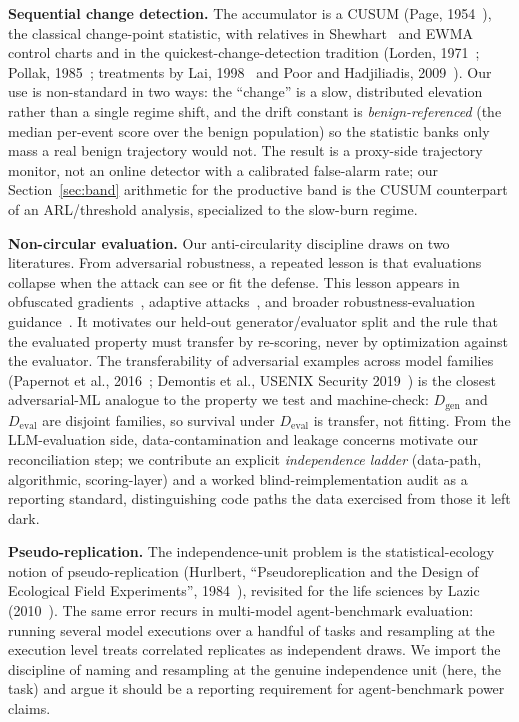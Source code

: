 \documentclass[11pt]{article}
\newcommand{\Dgen}{\ensuremath{D_{\mathrm{gen}}}}
\newcommand{\Deval}{\ensuremath{D_{\mathrm{eval}}}}
\begin{document}
\textbf{Sequential change detection.} The accumulator is a CUSUM (Page, 1954~\citep{page1954cusum}), the classical
change-point statistic, with relatives in Shewhart~\citep{shewhart1931economic} and EWMA~\citep{roberts1959ewma} control charts and in the
quickest-change-detection tradition (Lorden, 1971~\citep{lorden1971procedures}; Pollak, 1985~\citep{pollak1985optimal};
treatments by Lai, 1998~\citep{lai1998information} and Poor and Hadjiliadis, 2009~\citep{poor2009quickest}). Our use is non-standard in two ways: the ``change'' is a slow, distributed
elevation rather than a single regime shift, and the drift constant is \emph{benign-referenced} (the
median per-event score over the benign population) so the statistic banks only mass a real benign
trajectory would not. The result is a proxy-side trajectory monitor, not an online detector with a
calibrated false-alarm rate; our Section~\ref{sec:band} arithmetic for the productive band is the CUSUM
counterpart of an ARL/threshold analysis, specialized to the slow-burn regime.

\textbf{Non-circular evaluation.} Our anti-circularity discipline draws on two literatures. From
adversarial robustness, a repeated lesson is that evaluations collapse when the attack can see or fit the defense. This lesson appears in obfuscated gradients~\citep{athalye2018obfuscated}, adaptive attacks~\citep{tramer2020adaptive}, and broader robustness-evaluation guidance~\citep{carlini2019evaluating}. It motivates our held-out generator/evaluator split and the rule that the evaluated property must transfer by re-scoring, never by optimization against the evaluator. The transferability of adversarial examples across model
families (Papernot et al., 2016~\citep{papernot2017blackbox}; Demontis et al., USENIX Security 2019~\citep{demontis2019transfer}) is the closest adversarial-ML
analogue to the property we test and machine-check: \Dgen{} and \Deval{} are disjoint families, so
survival under \Deval{} is transfer, not fitting. From the LLM-evaluation side, data-contamination and leakage concerns motivate
our reconciliation step; we contribute an explicit \emph{independence ladder} (data-path, algorithmic,
scoring-layer) and a worked blind-reimplementation audit as a reporting standard, distinguishing code
paths the data exercised from those it left dark.

\textbf{Pseudo-replication.} The independence-unit problem is the statistical-ecology notion of
pseudo-replication (Hurlbert, ``Pseudoreplication and the Design of Ecological Field Experiments'', 1984~\citep{hurlbert1984pseudoreplication}),
revisited for the life sciences by Lazic (2010~\citep{lazic2010pseudoreplication}). The same error recurs in multi-model
agent-benchmark evaluation: running several model executions over a handful of tasks and resampling at
the execution level treats correlated replicates as independent draws. We import the discipline of
naming and resampling at the genuine independence unit (here, the task) and argue it should be a
reporting requirement for agent-benchmark power claims.
\end{document}
